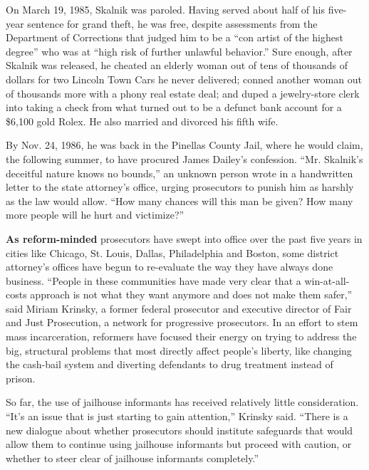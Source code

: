 On March 19, 1985, Skalnik was paroled. Having served about half of his
five-year sentence for grand theft, he was free, despite assessments
from the Department of Corrections that judged him to be a ``con artist
of the highest degree'' who was at ``high risk of further unlawful
behavior.'' Sure enough, after Skalnik was released, he cheated an
elderly woman out of tens of thousands of dollars for two Lincoln Town
Cars he never delivered; conned another woman out of thousands more with
a phony real estate deal; and duped a jewelry-store clerk into taking a
check from what turned out to be a defunct bank account for a \$6,100
gold Rolex. He also married and divorced his fifth wife.

By Nov. 24, 1986, he was back in the Pinellas County Jail, where he
would claim, the following summer, to have procured James Dailey's
confession. ``Mr. Skalnik's deceitful nature knows no bounds,'' an
unknown person wrote in a handwritten letter to the state attorney's
office, urging prosecutors to punish him as harshly as the law would
allow. ``How many chances will this man be given? How many more people
will he hurt and victimize?''

\textbf{As reform-minded} prosecutors have swept into office over the
past five years in cities like Chicago, St. Louis, Dallas, Philadelphia
and Boston, some district attorney's offices have begun to re-evaluate
the way they have always done business. ``People in these communities
have made very clear that a win-at-all-costs approach is not what they
want anymore and does not make them safer,'' said Miriam Krinsky, a
former federal prosecutor and executive director of Fair and Just
Prosecution, a network for progressive prosecutors. In an effort to stem
mass incarceration, reformers have focused their energy on trying to
address the big, structural problems that most directly affect people's
liberty, like changing the cash-bail system and diverting defendants to
drug treatment instead of prison.

So far, the use of jailhouse informants has received relatively little
consideration. ``It's an issue that is just starting to gain
attention,'' Krinsky said. ``There is a new dialogue about whether
prosecutors should institute safeguards that would allow them to
continue using jailhouse informants but proceed with caution, or whether
to steer clear of jailhouse informants completely.''

